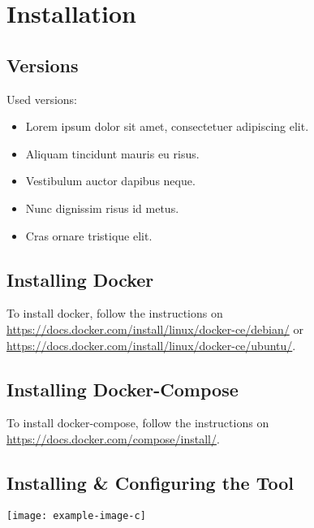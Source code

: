\section{Installation}
\subsection{Versions}
Used versions:
\begin{itemize}
	\item Lorem ipsum dolor sit amet, consectetuer adipiscing elit.
	\item Aliquam tincidunt mauris eu risus.
	\item Vestibulum auctor dapibus neque.
	\item Nunc dignissim risus id metus.
	\item Cras ornare tristique elit.
\end{itemize}

\subsection{Installing Docker}
To install docker, follow the instructions on \url{https://docs.docker.com/install/linux/docker-ce/debian/} or \url{https://docs.docker.com/install/linux/docker-ce/ubuntu/}.

\subsection{Installing Docker-Compose}
To install docker-compose, follow the instructions on \url{https://docs.docker.com/compose/install/}.

\subsection{Installing \& Configuring the Tool}
\lipsum[3]

\noindent\texttt{[image: example-image-c]} 